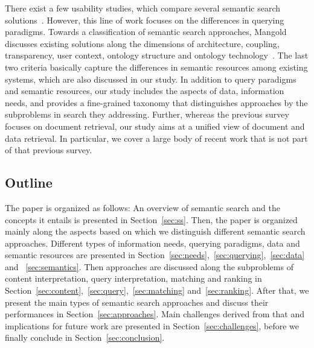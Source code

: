 There exist a few usability studies, which compare several semantic search solutions~\cite{DBLP:conf/semweb/KaufmannB07,DBLP:conf/esws/TranMH10}. However, this line of work focuses on the differences in querying paradigms. Towards a classification of semantic search approaches, Mangold discusses existing solutions along the dimensions of architecture, coupling, transparency, user context, ontology structure and ontology technology~\cite{DBLP:journals/ijmso/Mangold07}. The last two criteria basically capture the differences in semantic resources among existing systems, which are also discussed in our study. In addition to query paradigms and semantic resources, our study includes the aspects of data, information needs, and provides a fine-grained taxonomy that distinguishes approaches by the subproblems in search they addressing. Further, whereas the previous survey~\cite{DBLP:journals/ijmso/Mangold07} focuses on document retrieval, our study aims at a unified view of document and data retrieval. In particular, we cover a large body of recent work that is not part of that previous survey.  


 


\subsection{Outline}
The paper is organized as follows: An overview of semantic search and the concepts it entails is presented in Section~\ref{sec:ss}. Then, the paper is organized mainly along the aspects based on which we distinguish different semantic search approaches. Different types of information needs, querying paradigms, data and semantic resources are presented in Section~\ref{sec:needs},~\ref{sec:querying},~\ref{sec:data} and ~\ref{sec:semantics}. Then approaches are discussed along the subproblems of content interpretation, query interpretation, matching and ranking in Section~\ref{sec:content},~\ref{sec:query},~\ref{sec:matching} and~\ref{sec:ranking}. After that, we present the main types of semantic search approaches and discuss their performances in Section~\ref{sec:approaches}. Main challenges derived from that and implications for future work are presented in Section~\ref{sec:challenges}, before we finally conclude in Section~\ref{sec:conclusion}.